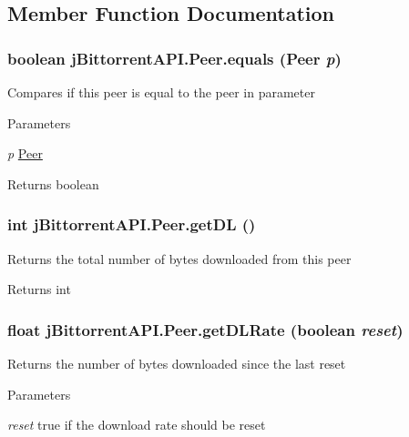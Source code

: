 \subsection{Member Function Documentation}
\hypertarget{classj_bittorrent_a_p_i_1_1_peer_a4c9f6cb8896bbb0874a53943fe56d74f}{
\subsubsection[{equals}]{\setlength{\rightskip}{0pt plus 5cm}boolean jBittorrentAPI.Peer.equals ({\bf Peer} {\em p})}}
\label{classj_bittorrent_a_p_i_1_1_peer_a4c9f6cb8896bbb0874a53943fe56d74f}
Compares if this peer is equal to the peer in parameter 
\begin{DoxyParams}{Parameters}
\item[{\em p}]\hyperlink{classj_bittorrent_a_p_i_1_1_peer}{Peer} \end{DoxyParams}
\begin{DoxyReturn}{Returns}
boolean 
\end{DoxyReturn}
\hypertarget{classj_bittorrent_a_p_i_1_1_peer_a4a3d9c05c162843efcf946b7b751d217}{
\subsubsection[{getDL}]{\setlength{\rightskip}{0pt plus 5cm}int jBittorrentAPI.Peer.getDL ()}}
\label{classj_bittorrent_a_p_i_1_1_peer_a4a3d9c05c162843efcf946b7b751d217}
Returns the total number of bytes downloaded from this peer \begin{DoxyReturn}{Returns}
int 
\end{DoxyReturn}
\hypertarget{classj_bittorrent_a_p_i_1_1_peer_a79fe669ebeaec347570b4f9acbcc73e9}{
\subsubsection[{getDLRate}]{\setlength{\rightskip}{0pt plus 5cm}float jBittorrentAPI.Peer.getDLRate (boolean {\em reset})}}
\label{classj_bittorrent_a_p_i_1_1_peer_a79fe669ebeaec347570b4f9acbcc73e9}
Returns the number of bytes downloaded since the last reset 
\begin{DoxyParams}{Parameters}
\item[{\em reset}]true if the download rate should be reset \end{DoxyParams}
